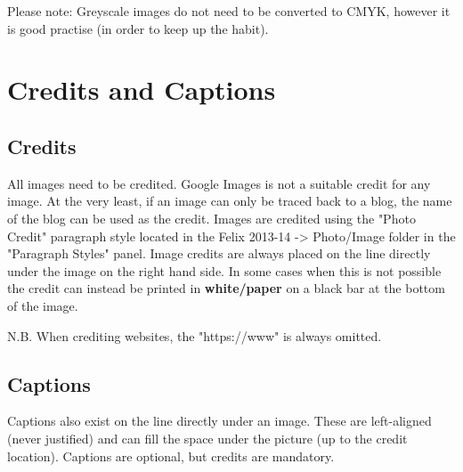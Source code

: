 Please note: Greyscale images do not need to be converted to CMYK, however it is good practise (in order to keep up the habit).

\section{Credits and Captions}


\subsection{Credits}

All images need to be credited. Google Images is not a suitable credit for any image. At the very least, if an image can only be traced back to a blog, the name of the blog can be used as the credit.
Images are credited using the "Photo Credit" paragraph style located in the Felix 2013-14 -> Photo/Image folder in the "Paragraph Styles" panel. Image credits are always placed on the line directly under the image on the right hand side. In some cases when this is not possible the credit can instead be printed in \textbf{white/paper} on a black bar at the bottom of the image.

N.B. When crediting websites, the "https://www" is always omitted. 

\subsection{Captions}

Captions also exist on the line directly under an image. These are left-aligned (never justified) and can fill the space under the picture (up to the credit location). Captions are optional, but credits are mandatory.



